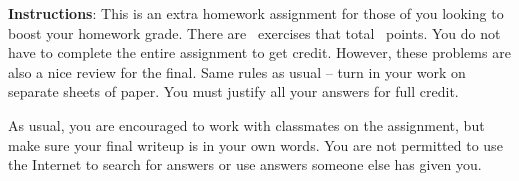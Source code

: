 \documentclass[10pt]{exam}
\begin{document}
\noindent \textbf{Instructions}: This is an extra homework assignment for those of you looking to boost your homework grade. There are \numquestions\, exercises that total \numpoints\, points. You do not have to complete the entire assignment to get credit. However, these problems are also a nice review for the final. Same rules as usual -- turn in your work on separate sheets of paper.  You must justify all your answers for full credit.

As usual, you are encouraged to work with classmates on the assignment, but make sure your final writeup is in your own words.  You are not permitted to use the Internet to search for answers or use answers someone else has given you.

\begin{questions}



\end{questions}
\end{document}
